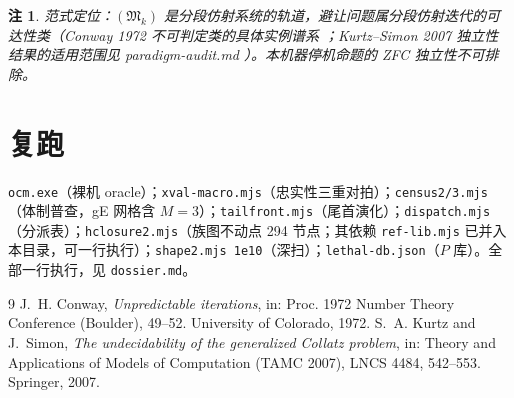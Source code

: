 \documentclass[11pt]{ctexart}
\newtheorem{remark}[theorem]{注}
\begin{document}
\begin{remark}
范式定位：$(\mathfrak M_k)$ 是分段仿射系统的轨道，避让问题属分段仿射迭代的可达性类（Conway 1972 不可判定类的具体实例谱系 \cite{conway72}；Kurtz--Simon 2007 独立性结果的适用范围见 paradigm-audit.md \cite{kurtzsimon07}）。本机器停机命题的 ZFC 独立性不可排除。
\end{remark}

\section*{复跑}
\texttt{ocm.exe}（裸机 oracle）；\texttt{xval-macro.mjs}（忠实性三重对拍）；\texttt{census2/3.mjs}（体制普查，gE 网格含 $M{=}3$）；\texttt{tailfront.mjs}（尾首演化）；\texttt{dispatch.mjs}（分派表）；\texttt{hclosure2.mjs}（族图不动点 294 节点；其依赖 \texttt{ref-lib.mjs} 已并入本目录，可一行执行）；\texttt{shape2.mjs 1e10}（深扫）；\texttt{lethal-db.json}（$P$ 库）。全部一行执行，见 \texttt{dossier.md}。

\begin{thebibliography}{9}
 J.~H. Conway, \emph{Unpredictable iterations}, in: Proc. 1972 Number Theory Conference (Boulder), 49--52. University of Colorado, 1972.
 S.~A. Kurtz and J.~Simon, \emph{The undecidability of the generalized Collatz problem}, in: Theory and Applications of Models of Computation (TAMC 2007), LNCS 4484, 542--553. Springer, 2007.
\end{thebibliography}
\end{document}
